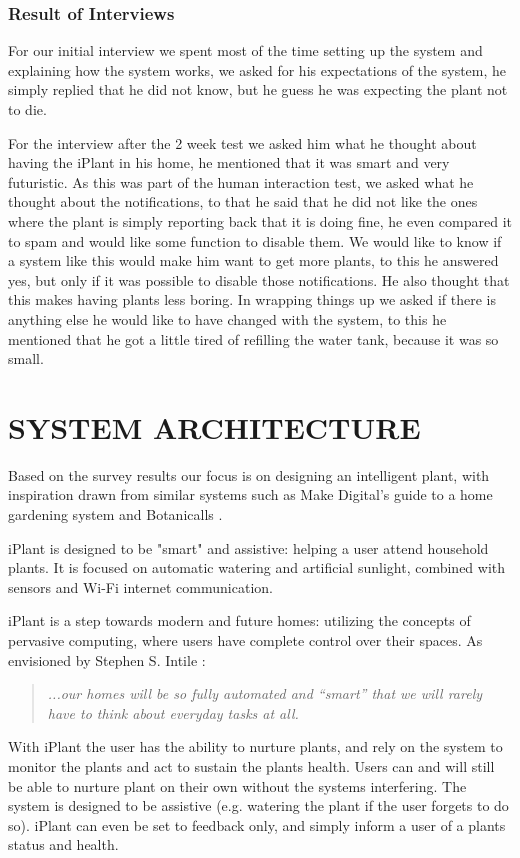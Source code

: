 \documentclass{ubicomp2012}
\begin{document}
\subsubsection{Result of Interviews}
For our initial interview we spent most of the time setting up the system and explaining how the system works, we asked for his expectations of the system, he simply replied that he did not know, but he guess he was expecting the plant not to die.

For the interview after the 2 week test we asked him what he thought about having the iPlant in his home, he mentioned that it was smart and very futuristic. As this was part of the human interaction test, we asked what he thought about the notifications, to that he said that he did not like the ones where the plant is simply reporting back that it is doing fine, he even compared it to spam and would like some function to disable them. We would like to know if a system like this would make him want to get more plants, to this he answered yes, but only if it was possible to disable those notifications. He also thought that this makes having plants less boring. In wrapping things up we asked if there is anything else he would like to have changed with the system, to this he mentioned that he got a little tired of refilling the water tank, because it was so small.


\section{SYSTEM ARCHITECTURE}
Based on the survey results our focus is on designing an intelligent plant, with inspiration drawn from similar systems such as Make Digital's guide to a home gardening system \cite{how-to-make-a-gardening-system} and Botanicalls \cite{botanicalls}.

iPlant is designed to be "smart" and assistive: helping a user attend household plants. It is focused on automatic watering and artificial sunlight, combined with sensors and Wi-Fi internet communication.

iPlant is a step towards modern and future homes: utilizing the concepts of pervasive computing, where users have complete control over their spaces. As envisioned by Stephen S. Intile \cite{future-homes}: 
\begin{quotation} \em...our homes will be so fully automated and “smart” that we will rarely have to think about everyday tasks at all.
\end{quotation}
With iPlant the user has the ability to nurture plants, and rely on the system to monitor the plants and act to sustain the plants health. Users can and will still be able to nurture plant on their own without the systems interfering. The system is designed to be assistive (e.g. watering the plant if the user forgets to do so). iPlant can even be set to feedback only, and simply inform a user of a plants status and health.
\end{document}
